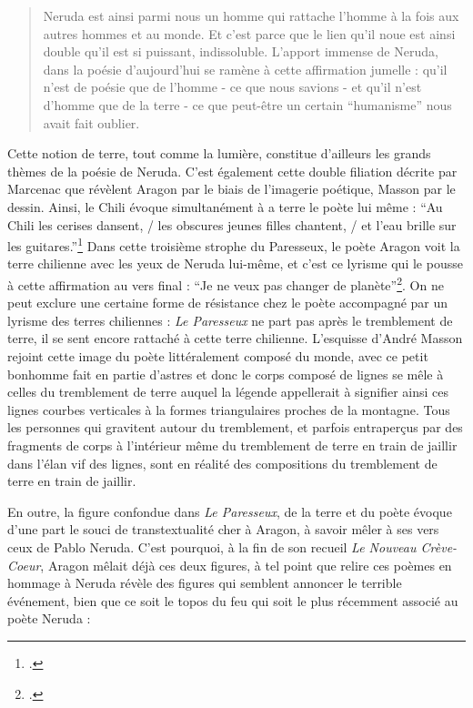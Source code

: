 \begin{quote}
Neruda est ainsi parmi nous un homme qui rattache l’homme à la fois aux autres hommes et au monde. Et c’est parce que le lien qu’il noue est ainsi double qu’il est si puissant, indissoluble. L’apport immense de Neruda, dans la poésie d’aujourd’hui se ramène à cette affirmation jumelle : qu’il n’est de poésie que de l’homme - ce que nous savions - et qu’il n’est d’homme que de la terre - ce que peut-être un certain \enquote{humanisme} nous avait fait oublier.	
\end{quote}

Cette notion de terre, tout comme la lumière, constitue d’ailleurs les grands thèmes de la poésie de Neruda. C’est également cette double filiation décrite par Marcenac que révèlent Aragon par le biais de l’imagerie poétique, Masson par le dessin. Ainsi, le Chili évoque simultanément à a terre le poète lui même : \enquote{Au Chili les cerises dansent, / les obscures jeunes filles chantent, / et l'eau brille sur les guitares.}\footcite{pabloneruda} Dans cette troisième strophe du Paresseux, le poète Aragon voit la terre chilienne avec les yeux de Neruda lui-même, et c’est ce lyrisme qui le pousse à cette affirmation au vers final : \enquote{Je ne veux pas changer de planète}\footcite{pabloneruda}.  On ne peut exclure une certaine forme de résistance chez le poète accompagné par un lyrisme des terres chiliennes : \emph{Le Paresseux }ne part pas après le tremblement de terre, il se sent encore rattaché à cette terre chilienne. L’esquisse d’André Masson rejoint cette image du poète littéralement composé du monde, avec ce petit bonhomme fait en partie d’astres et donc le corps composé de lignes se mêle à celles du tremblement de terre auquel la légende appellerait à signifier ainsi ces lignes courbes verticales à la formes triangulaires proches de la montagne. Tous les personnes qui gravitent autour du tremblement, et parfois entraperçus par des fragments de corps à l’intérieur même du tremblement de terre en train de jaillir dans l’élan vif des lignes, sont en réalité des compositions du tremblement de terre en train de jaillir. 

	En outre, la figure confondue dans \emph{Le Paresseux}, de la terre et du poète évoque d’une part le souci de transtextualité cher à Aragon, à savoir mêler à ses vers ceux de Pablo Neruda. C’est pourquoi, à la fin de son recueil \emph{Le Nouveau Crève-Coeur}, Aragon mêlait déjà ces deux figures, à tel point que relire ces poèmes en hommage à Neruda révèle des figures qui semblent annoncer le terrible événement, bien que ce soit le topos du feu qui soit le plus récemment associé au poète Neruda : 

